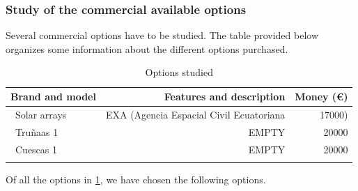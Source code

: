\subsubsection{Study of the commercial available options}
Several commercial options have to be studied. The table provided below organizes some information about the different options purchased.

\begin{longtable}{| l | r | r | }
\hline
\rowcolor[gray]{0.80}	\textbf{Brand and model} &  \textbf{Features and description}     & \textbf{Money (\euro)}   \\
\hline
\endfirsthead

	   ~Solar arrays & EXA (Agencia Espacial Civil Ecuatoriana & 17000) \\
	   ~Truñaas 1 & EMPTY & 20000 \\
	   ~Cuescas 1 & EMPTY & 20000 \\
	\hline

\caption{Options studied}
\label{epsoptionstable}
\end{longtable}

Of all the options in \ref{epsoptionstable}, we have chosen the following options.
